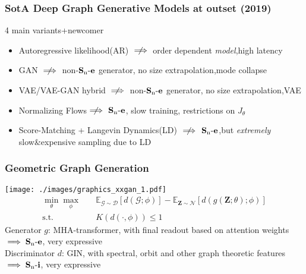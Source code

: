 \documentclass[./presentation.tex]{subfiles}
\begin{document}
\begin{frame}[label=ggg]
  \frametitle{SotA Deep Graph Generative Models at outset (2019)}
  \vspace{-1cm}
  \small
  4 main variants+newcomer
  \begin{itemize}
    \item Autoregressive likelihood(AR) $\centernot\implies$ order dependent \emph{model},high latency
    \item GAN %
      $\centernot\implies$ non-$\operatorname{\mathbf{S}_n\mathbf{-e}}$ generator, no size extrapolation,mode collapse
    \item VAE/VAE-GAN hybrid%
      $\centernot\implies$ non-$\operatorname{\mathbf{S}_n\mathbf{-e}}$ generator, no size extrapolation,VAE%
    \item Normalizing Flows$\centernot\implies$ $\operatorname{\mathbf{S}_n\mathbf{-e}}$, slow training, restrictions on $J_\theta$%
    \item Score-Matching + Langevin Dynamics(LD)  $\centernot\implies$ $\operatorname{\mathbf{S}_n\mathbf{-e}}$,but \emph{extremely} slow\&expensive sampling due to LD
  \end{itemize}
\end{frame}


\begin{frame}[label=ggg,t]
  \frametitle{Geometric Graph Generation}
  \texttt{[image: ./images/graphics\_xxgan\_1.pdf]}
  \vspace{-0.5cm}
  \begin{align}
    \min_{\theta}\max_{\phi}&\quad\mathbb{E}_{\mathcal{G}\sim \mathcal{D}}\left[d\left(\mathcal{G};\phi\right)\right]-\mathbb{E}_{\mathbf{Z}\sim \mathcal{N}}\left[d\left(g(\mathbf{Z};\theta);\phi\right)\right]\nonumber\\
    \text{s.t.}&\quad K\left(d\left(\cdot,\phi\right)\right)\leq 1\nonumber
  \end{align}
  \vspace{-0.25cm}
  Generator $g$: MHA-transformer, with final readout based on attention weights$\implies\operatorname{\mathbf{S}_n\mathbf{-e}}$, very expressive\\
  Discriminator $d$: GIN, with spectral, orbit and other graph theoretic features$\implies\operatorname{\mathbf{S}_n\mathbf{-i}}$, very expressive
\end{frame}
\end{document}
